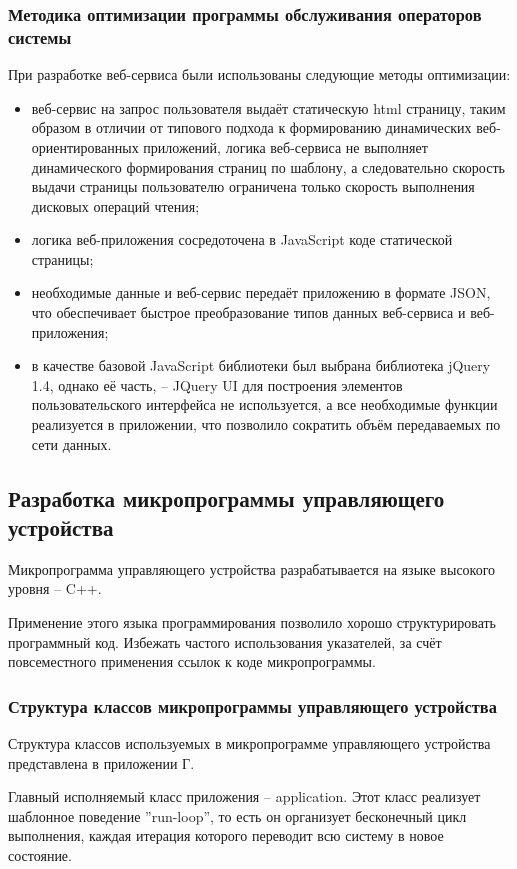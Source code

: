 \subsubsection{Методика оптимизации программы обслуживания операторов системы}
При разработке веб-сервиса были использованы следующие методы оптимизации:
\begin{itemize}
	\item веб-сервис на запрос пользователя выдаёт статическую html страницу, таким образом
		в отличии от типового подхода к формированию динамических веб-ориентированных приложений,
		логика веб-сервиса не выполняет динамического формирования страниц по шаблону, а следовательно
		скорость выдачи страницы пользователю ограничена только скорость выполнения дисковых операций чтения;
	\item логика веб-приложения сосредоточена в JavaScript коде статической страницы;
	\item необходимые данные и веб-сервис передаёт приложению в формате JSON,
	что обеспечивает быстрое преобразование типов данных веб-сервиса и веб-приложения;
	\item в качестве базовой JavaScript библиотеки был выбрана библиотека jQuery 1.4, однако её часть, -- JQuery UI
	для построения элементов пользовательского интерфейса не используется, а все необходимые функции реализуется
	в приложении, что позволило сократить объём передаваемых по сети данных.
\end{itemize}


\subsection{Разработка микропрограммы управляющего устройства}
Микропрограмма управляющего устройства разрабатывается на языке высокого уровня -- C++.

Применение этого языка программирования позволило хорошо структурировать программный код.
Избежать частого использования указателей, за счёт повсеместного применения ссылок к коде
микропрограммы.


\subsubsection{Структура классов микропрограммы управляющего устройства}
Структура классов используемых в микропрограмме управляющего устройства представлена в
приложении Г.

Главный исполняемый класс приложения -- application. Этот класс реализует шаблонное поведение
''run-loop'', то есть он организует бесконечный цикл выполнения, каждая итерация которого переводит
всю систему в новое состояние.

